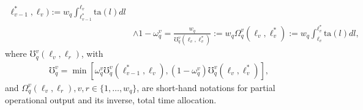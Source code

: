 \documentclass[hidelinks, nonatbib]{elsarticle}
\begin{document}
\begin{enumerate}
\begin{align}
            \ell_{v-1}^{*}
            ,\ell_{v}
        )
        :=
        w_q
        \int_{
            \ell_{v-1}^{*}
        }^{
            \ell_{v}
        }{
            \text{ta}(l)
            dl
        }
        \\
        &\land
        1 - \omega_{q}^{v}
        =
        \frac{w_q}{
            \mho_{q}^{v}(
                \ell_{v}
                ,\ell_{v}^{*}
            )
        }
        :=
        w_q
        \Omega_{q}^{v}(
            \ell_{v}
            ,\ell_{v}^{*}
        )
        :=
        w_q
        \int_{
            \ell_{v}
        }^{
            \ell_{v}^{*}
        }{
            \text{ta}(l)
            dl
        }
        ,
    \end{align}
    where $\mho_{q}^{v}(\ell_{v},\ell_{r})$, with
    \begin{gather}
        \mho_{q}^{v}
        =
        \min
        \left[
            \omega_{q}^{v}
            \mho_{q}^{v}(
                \ell_{v-1}^{*}
                ,\ell_{v}
            )
            ,
            (1 - \omega_{q}^{v})
            \mho_{q}^{v}(
                \ell_{v}
                ,\ell_{v}^{*}
            )
        \right]
        ,
    \end{gather}
    and $\Omega_{q}^{v}(\ell_{v},\ell_{r}), v, r \in \{1, \dots, w_q\}$, are short-hand notations for partial operational output and its inverse, total time allocation.


\end{enumerate}
\end{document}
